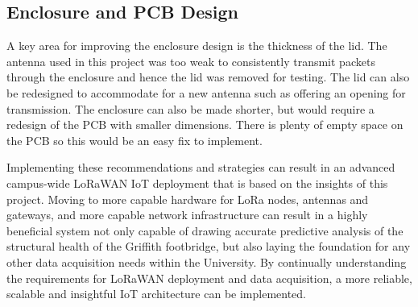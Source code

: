 \subsection{Enclosure and PCB Design} 
A key area for improving the enclosure design is the thickness of the lid. The antenna used in this project was too weak to consistently transmit packets through the enclosure and hence the lid was removed for testing. The lid can also be redesigned to accommodate for a new antenna such as offering an opening for transmission. The enclosure can also be made shorter, but would require a redesign of the PCB with smaller dimensions. There is plenty of empty space on the PCB so this would be an easy fix to implement. 

Implementing these recommendations and strategies can result in an advanced campus-wide LoRaWAN IoT deployment that is based on the insights of this project. Moving to more capable hardware for LoRa nodes, antennas and gateways, and more capable network infrastructure can result in a highly beneficial system not only capable of drawing accurate predictive analysis of the structural health of the Griffith footbridge, but also laying the foundation for any other data acquisition needs within the University. By continually understanding the requirements for LoRaWAN deployment and data acquisition, a more reliable, scalable and insightful IoT architecture can be implemented. 

